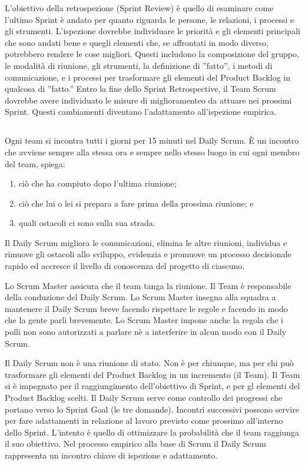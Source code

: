 L'obiettivo della retrospezione (Sprint Review) \`e quello di esaminare come l'ultimo Sprint \`e andato per quanto riguarda le persone,
le relazioni, i processi e gli strumenti. L'ispezione dovrebbe individuare le priorit\`a e gli elementi principali che
sono andati bene e quegli elementi che, se affrontati in modo diverso, potrebbero rendere le cose migliori. Questi includono la
composizione del gruppo, le modalit\`a di riunione, gli strumenti, la definizione di ''fatto'', i metodi di
comunicazione, e i processi per trasformare gli elementi del Product Backlog in qualcosa di ''fatto.'' Entro la fine
dello Sprint Retrospective, il Team Scrum dovrebbe avere individuato le misure di miglioramenteo da attuare nei
prossimi Sprint. Questi cambiamenti diventano l'adattamento all'ispezione empirica.


\subsection*{\color{Blue}{DAILY SCRUM}}
\label{sec:dailyscrum}
Ogni team si incontra tutti i giorni per 15 minuti nel Daily Scrum. \`E un incontro che avviene sempre alla stessa ora
e sempre nello stesso luogo in cui ogni membro del team, spiega:
\begin{enumerate}
	\item ci\`o che  ha compiuto dopo l'ultima riunione;
	\item ci\`o che lui o lei si prepara a fare prima della prossima riunione; e
	\item quali ostacoli ci sono sulla sua strada.
\end{enumerate}

Il Daily Scrum migliora le comunicazioni, elimina le altre riunioni, individua e rimuove gli ostacoli allo sviluppo,
evidenzia e promuove un processo decisionale rapido ed accresce il livello di conoscenza del progetto di ciascuno.
\newline

Lo Scrum Master assicura che il team tanga la riunione. Il Team \`e responsabile della conduzione del Daily Scrum. Lo
Scrum Master insegna alla squadra a mantenere il Daily Scrum breve facendo rispettare le regole e facendo in modo che
la gente parli brevemente. Lo Scrum Master impone anche la regola che i polli non sono autorizzati a parlare n\`e a interferire in alcun
modo con il Daily Scrum.
 \newline

Il Daily Scrum non \`e una riunione di stato. Non \`e per chiunque, ma per chi pu\`o trasformare gli elementi del
Product Backlog in un incremento (il Team). Il Team si \`e impegnato per il raggiungimento dell'obiettivo di Sprint,  e per
gl elementi del Product Backlog scelti. Il Daily Scrum serve come controllo dei progressi che portano verso lo Sprint Goal (le
tre domande). 
Incontri successivi possono servire per fare adattamenti in relazione al lavoro previsto come prossimo all'interno dello Sprint.
L'intento \`e quello di ottimizzare la probabilit\`a che il team raggiunga il suo obiettivo. Nel processo
empirico alla base di Scrum il Daily Scrum rappresenta un incontro chiave di ispezione e adattamento.

